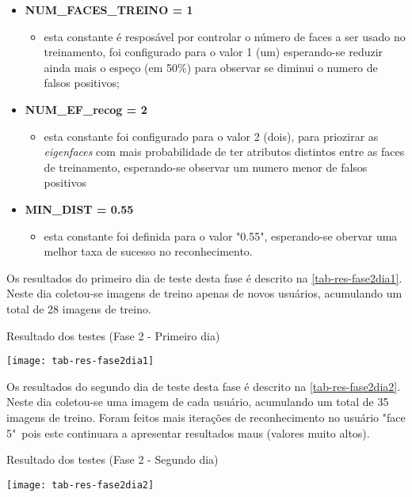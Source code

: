\begin{itemize}	
	\item \textbf{NUM\_FACES\_TREINO = 1}
	\begin{itemize}	
		\item esta constante é resposável por controlar o número de faces a ser usado no treinamento, foi configurado para o valor 1 (um) esperando-se reduzir ainda mais o espeço (em 50\%) para observar se diminui o numero de falsos positivos;
	\end{itemize}
	
	\item \textbf{NUM\_EF\_recog = 2}
	\begin{itemize}	
		\item esta constante foi configurado para o valor 2 (dois), para priozirar as \textit{eigenfaces} com mais probabilidade de ter atributos distintos entre as faces de treinamento, esperando-se observar um numero menor de falsos positivos
	\end{itemize}
	
	\item \textbf{MIN\_DIST = 0.55}
	\begin{itemize}	
		\item esta constante foi definida para o valor "0.55", esperando-se obervar uma melhor taxa de sucesso no reconhecimento.
	\end{itemize}
\end{itemize}

Os resultados do primeiro dia de teste desta fase é descrito na \autoref{tab-res-fase2dia1}. Neste dia coletou-se imagens de treino apenas de novos usuários, acumulando um total de 28 imagens de treino. 


\begin{table}[h]
	\centering
	\caption{Resultado dos testes (Fase 2 - Primeiro dia) }
	\texttt{[image: tab-res-fase2dia1]}
	\label{tab-res-fase2dia1}
\end{table}


Os resultados do segundo dia de teste desta fase é descrito na \autoref{tab-res-fase2dia2}. Neste dia coletou-se uma imagem de cada usuário, acumulando um total de 35 imagens de treino. Foram feitos mais iterações de reconhecimento no usuário "face 5"\ pois este continuara a apresentar resultados maus (valores muito altos).


\begin{table}[h]
	\centering
	\caption{Resultado dos testes (Fase 2 - Segundo dia) }
	\texttt{[image: tab-res-fase2dia2]}
	\label{tab-res-fase2dia2}
\end{table}



